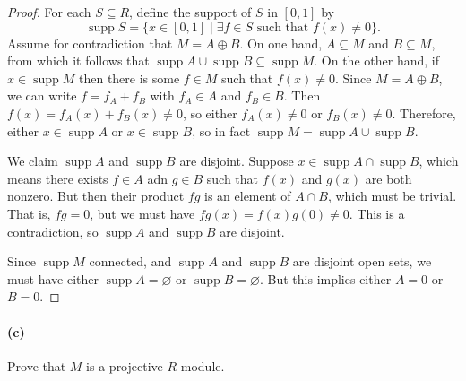 \documentclass[12pt]{article}
\newlength{\myparskip}
\newenvironment{fullbox}{\begin{lrbox}{\savefullbox}\begin{minipage}{\dimexpr\textwidth-2\fboxsep\relax}\setlength{\parskip}{\myparskip}}{\end{minipage}\end{lrbox}\framebox[\textwidth]{\usebox{\savefullbox}}}
\newenvironment{pbox}[1][]{\begin{fullbox}\def\temp{#1}\ifx\temp\empty\else\paragraph{#1}\phantom{}\fi}{\end{fullbox}}
\theoremstyle{definition}
\renewcommand{\emptyset}{\varnothing}
\newcommand{\<}{\langle}
\renewcommand{\>}{\rangle}
\newcommand{\seq}{\subseteq}
\renewcommand{\_}[1]{{_{#1}}}
\newcommand{\supp}{\operatorname{supp}}
\begin{document}
\begin{proof}
    For each $S \seq R$, define the support of $S$ in $[0, 1]$ by
    \[
        \supp S = \{x \in [0, 1] \mid \exists f \in S \text{ such that } f(x) \ne 0\}.
    \]
    Assume for contradiction that $M = A \oplus B$.
    On one hand, $A \seq M$ and $B \seq M$, from which it follows that $\supp A \cup \supp B \seq \supp M$.
    On the other hand, if $x \in \supp M$ then there is some $f \in M$ such that $f(x) \ne 0$.
    Since $M = A \oplus B$, we can write $f = f_A + f_B$ with $f_A \in A$ and $f_B \in B$.
    Then $f(x) = f_A(x) + f_B(x) \ne 0$, so either $f_A(x) \ne 0$ or $f_B(x) \ne 0$.
    Therefore, either $x \in \supp A$ or $x \in \supp B$, so in fact $\supp M = \supp A \cup \supp B$.

    We claim $\supp A$ and $\supp B$ are disjoint.
    Suppose $x \in \supp A \cap \supp B$, which means there exists $f \in A$ adn $g \in B$ such that $f(x)$ and $g(x)$ are both nonzero.
    But then their product $fg$ is an element of $A \cap B$, which must be trivial.
    That is, $fg = 0$, but we must have $fg(x) = f(x)g(0) \ne 0$.
    This is a contradiction, so $\supp A$ and $\supp B$ are disjoint.

    Since $\supp M$ connected, and $\supp A$ and $\supp B$ are disjoint open sets, we must have either $\supp A = \emptyset$ or $\supp B = \emptyset$.
    But this implies either $A = 0$ or $B = 0$.
\end{proof}



\begin{pbox}[(c)]
    Prove that $M$ is a projective $R$-module.
\end{pbox}
\end{document}

